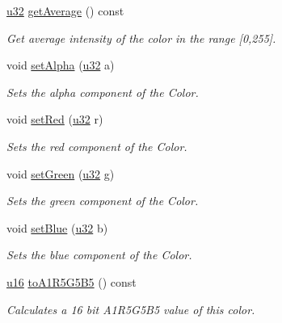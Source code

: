 \begin{DoxyCompactItemize}
\mbox{\label{classirr_1_1video_1_1SColor_a6a528306d2322e20c93aadc2debbd3d6}} 
\hyperlink{namespaceirr_a0416a53257075833e7002efd0a18e804}{u32} \hyperlink{classirr_1_1video_1_1SColor_a6a528306d2322e20c93aadc2debbd3d6}{get\+Average} () const
\begin{DoxyCompactList}\small\item\em Get average intensity of the color in the range \mbox{[}0,255\mbox{]}. \end{DoxyCompactList}\item 
void \hyperlink{classirr_1_1video_1_1SColor_a7bfe4abc30d563668b947c8bdb055bab}{set\+Alpha} (\hyperlink{namespaceirr_a0416a53257075833e7002efd0a18e804}{u32} a)
\begin{DoxyCompactList}\small\item\em Sets the alpha component of the Color. \end{DoxyCompactList}\item 
void \hyperlink{classirr_1_1video_1_1SColor_a950c98714711ae9dd8c5219f83c07693}{set\+Red} (\hyperlink{namespaceirr_a0416a53257075833e7002efd0a18e804}{u32} r)
\begin{DoxyCompactList}\small\item\em Sets the red component of the Color. \end{DoxyCompactList}\item 
void \hyperlink{classirr_1_1video_1_1SColor_af80cfedd5e761216b8bed259963ac948}{set\+Green} (\hyperlink{namespaceirr_a0416a53257075833e7002efd0a18e804}{u32} g)
\begin{DoxyCompactList}\small\item\em Sets the green component of the Color. \end{DoxyCompactList}\item 
void \hyperlink{classirr_1_1video_1_1SColor_a13d82e6b52d32f7394f3cce041dc2965}{set\+Blue} (\hyperlink{namespaceirr_a0416a53257075833e7002efd0a18e804}{u32} b)
\begin{DoxyCompactList}\small\item\em Sets the blue component of the Color. \end{DoxyCompactList}\item 
\hyperlink{namespaceirr_ae9f8ec82692ad3b83c21f555bfa70bcc}{u16} \hyperlink{classirr_1_1video_1_1SColor_aaa60619bb953ba3fd472b0193eda558e}{to\+A1\+R5\+G5\+B5} () const
\begin{DoxyCompactList}\small\item\em Calculates a 16 bit A1\+R5\+G5\+B5 value of this color. \end{DoxyCompactList}\item 

\end{DoxyCompactItemize}
